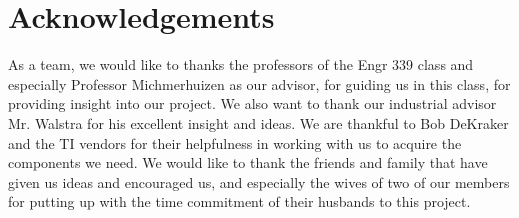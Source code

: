 \documentclass[ppfs.tex]{template/subfiles}
\begin{document}
\section{Acknowledgements}

As a team, we would like to thanks the professors of the Engr 339 class and especially Professor Michmerhuizen as our advisor, for guiding us in this class, for providing insight into our project. We also want to thank our industrial advisor Mr. Walstra for his excellent insight and ideas.
We are thankful to Bob DeKraker and the TI vendors for their helpfulness in working with us to acquire the components we need.
We would like to thank the friends and family that have given us ideas and encouraged us, and especially the wives of two of our members for putting up with the time commitment of their husbands to this project.
\end{document}
